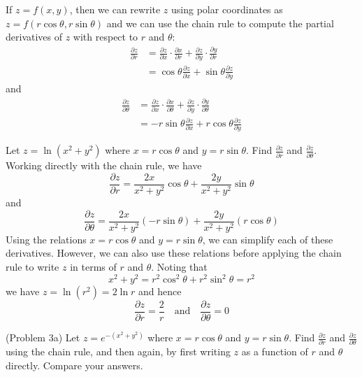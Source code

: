 \documentclass[handout]{ximera}
\begin{document}
If $z = f(x,y)$, then we can rewrite $z$ using polar coordinates 
as $z = f(r\cos \theta, r \sin \theta)$ and we can use the chain rule to 
compute the partial derivatives of $z$ with respect to $r$ and $\theta$:
\begin{align*}
\frac{\partial z}{\partial r} &= \frac{\partial z}{\partial x} \cdot \frac{\partial x}{\partial r} + \frac{\partial z}{\partial y} \cdot \frac{\partial y}{\partial r}\\
                              &= \cos \theta \frac{\partial z}{\partial x} + \sin \theta \frac{\partial z}{\partial y}
\end{align*}
and
\begin{align*}
\frac{\partial z}{\partial \theta} &= \frac{\partial z}{\partial x} \cdot \frac{\partial x}{\partial \theta} 
                                      + \frac{\partial z}{\partial y} \cdot \frac{\partial y}{\partial \theta}\\
                              &= -r\sin \theta \frac{\partial z}{\partial x} + r \cos \theta \frac{\partial z}{\partial y}
\end{align*}


\begin{example}[Example 3]
Let $z = \ln(x^2 + y^2)$ where $x = r\cos \theta$ and $y = r\sin \theta$.  
Find $\frac{\partial z}{\partial r}$ and $\frac{\partial z}{\partial \theta}$.\\
Working directly with the chain rule, we have
\[
\frac{\partial z}{\partial r} = \frac{2x}{x^2+y^2} \cos \theta + \frac{2y}{x^2+y^2} \sin \theta
\]
and
\[
\frac{\partial z}{\partial \theta} = \frac{2x}{x^2+y^2} (-r\sin \theta) + \frac{2y}{x^2+y^2} (r\cos \theta)
\]
Using the relations $x = r\cos \theta$ and $y = r\sin \theta$, we can simplify 
each of these derivatives.
However, we can also use these relations before applying the chain rule to 
write $z$ in terms of $r$ and $\theta$.
Noting that
\[
x^2 + y^2 = r^2 \cos^2 \theta + r^2 \sin^2 \theta = r^2
\]
we have $z = \ln(r^2) = 2\ln r$ and hence
\[
\frac{\partial z}{\partial r} = \frac{2}{r} \quad \text{and} \quad \frac{\partial z}{\partial \theta} = 0
\]
\end{example}


\begin{problem}(Problem 3a)
Let $z = e^{-(x^2 + y^2)}$ where $x = r\cos \theta$ and $y = r\sin \theta$.  
Find $\frac{\partial z}{\partial r}$ and $\frac{\partial z}{\partial \theta}$ using 
the chain rule, 
and then again, by first writing $z$ as a function of $r$ and $\theta$ directly. 
Compare your answers.
\end{problem}
\end{document}
